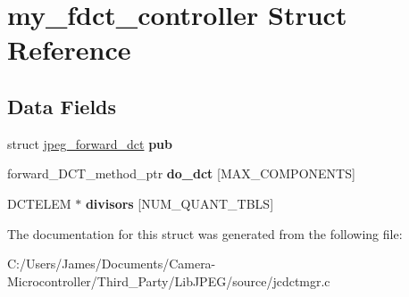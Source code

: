 \hypertarget{structmy__fdct__controller}{}\section{my\+\_\+fdct\+\_\+controller Struct Reference}
\label{structmy__fdct__controller}
\subsection*{Data Fields}
\begin{DoxyCompactItemize}
\item 
\mbox{\label{structmy__fdct__controller_a12742d7fdd2bcbc2304dcbdee3daf475}} 
struct \hyperlink{structjpeg__forward__dct}{jpeg\+\_\+forward\+\_\+dct} {\bfseries pub}
\item 
\mbox{\label{structmy__fdct__controller_a4354e2cfbaac884428df3a13a7801a77}} 
forward\+\_\+\+D\+C\+T\+\_\+method\+\_\+ptr {\bfseries do\+\_\+dct} \mbox{[}M\+A\+X\+\_\+\+C\+O\+M\+P\+O\+N\+E\+N\+TS\mbox{]}
\item 
\mbox{\label{structmy__fdct__controller_ae3e44ec188292cbc5b0b87b51ea4ad92}} 
D\+C\+T\+E\+L\+EM $\ast$ {\bfseries divisors} \mbox{[}N\+U\+M\+\_\+\+Q\+U\+A\+N\+T\+\_\+\+T\+B\+LS\mbox{]}
\end{DoxyCompactItemize}


The documentation for this struct was generated from the following file\+:\begin{DoxyCompactItemize}
\item 
C\+:/\+Users/\+James/\+Documents/\+Camera-\/\+Microcontroller/\+Third\+\_\+\+Party/\+Lib\+J\+P\+E\+G/source/jcdctmgr.\+c\end{DoxyCompactItemize}
